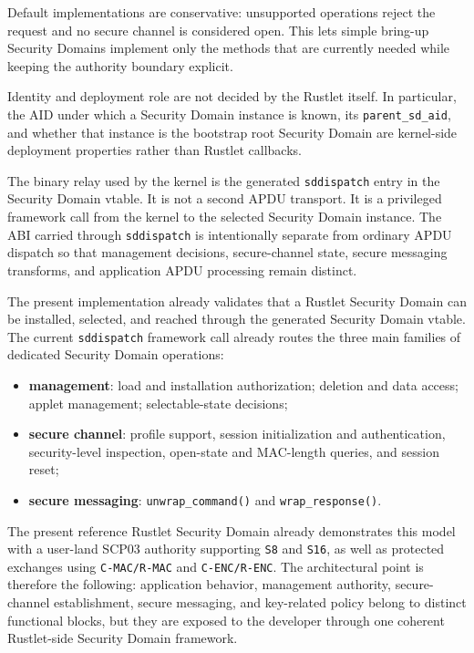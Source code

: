 Default implementations are conservative: unsupported operations reject
the request and no secure channel is considered open. This lets simple
bring-up Security Domains implement only the methods that are currently
needed while keeping the authority boundary explicit.

Identity and deployment role are not decided by the Rustlet itself.
In particular, the AID under which a Security Domain instance is known,
its \texttt{parent\_sd\_aid}, and whether that instance is the bootstrap root
Security Domain are kernel-side deployment properties rather than Rustlet
callbacks.

The binary relay used by the kernel is the generated
\texttt{sddispatch} entry in the Security Domain vtable. It is not a
second APDU transport. It is a privileged framework call from the kernel
to the selected Security Domain instance. The ABI carried through
\texttt{sddispatch} is intentionally separate from ordinary APDU
dispatch so that management decisions, secure-channel state, secure
messaging transforms, and
application APDU processing remain distinct.

The present implementation already validates that a Rustlet Security
Domain can be installed, selected, and reached through the generated
Security Domain vtable. The current \texttt{sddispatch} framework call
already routes the three main families of dedicated Security Domain
operations:
\begin{itemize}
\item \textbf{management}: load and installation authorization; deletion and
  data access; applet management; selectable-state decisions;
\item \textbf{secure channel}: profile support, session initialization and
  authentication, security-level inspection, open-state and MAC-length
  queries, and session reset;
\item \textbf{secure messaging}: \texttt{unwrap\_command()} and
  \texttt{wrap\_response()}.
\end{itemize}

The present reference Rustlet Security Domain already demonstrates this
model with a user-land SCP03 authority supporting \texttt{S8} and
\texttt{S16}, as well as protected exchanges using
\texttt{C-MAC/R-MAC} and \texttt{C-ENC/R-ENC}. The architectural point
is therefore the following: application behavior, management authority,
secure-channel establishment, secure messaging, and key-related policy
belong to distinct functional blocks, but they are exposed to the
developer through one coherent Rustlet-side Security Domain framework.

